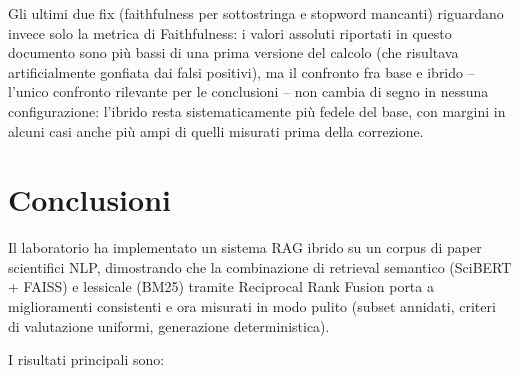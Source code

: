 \documentclass[12pt,a4paper]{article}
\begin{document}
Gli ultimi due fix (faithfulness per sottostringa e stopword mancanti) riguardano invece solo la metrica di Faithfulness: i valori assoluti riportati in questo documento sono pi\`u bassi di una prima versione del calcolo (che risultava artificialmente gonfiata dai falsi positivi), ma il confronto fra base e ibrido -- l'unico confronto rilevante per le conclusioni -- non cambia di segno in nessuna configurazione: l'ibrido resta sistematicamente pi\`u fedele del base, con margini in alcuni casi anche pi\`u ampi di quelli misurati prima della correzione.

\section{Conclusioni}

Il laboratorio ha implementato un sistema RAG ibrido su un corpus di paper scientifici NLP, dimostrando che la combinazione di retrieval semantico (SciBERT + FAISS) e lessicale (BM25) tramite Reciprocal Rank Fusion porta a miglioramenti consistenti e ora misurati in modo pulito (subset annidati, criteri di valutazione uniformi, generazione deterministica).

I risultati principali sono:
\end{document}
